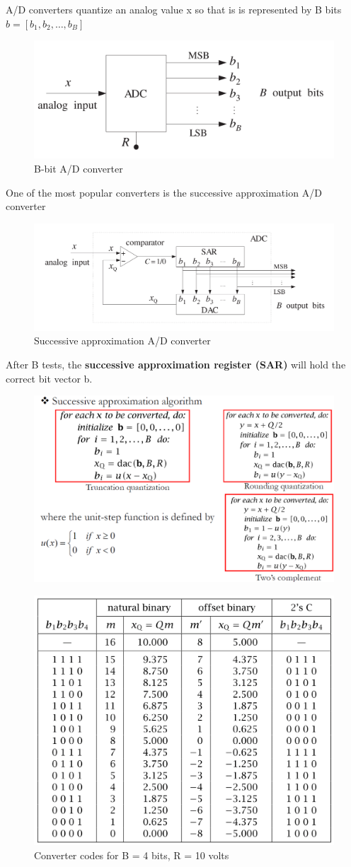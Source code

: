\documentclass[11pt, a4paper]{article}
\begin{document}
A/D converters quantize an analog value x so that is is represented by B bits  $b=[b_1, b_2,…,b_B]$
\begin{figure}[h!]
    \centering
    \includegraphics[width=0.5\linewidth]{img/21.png}
    \caption{B-bit A/D converter}
\end{figure}
\newpage
One of the most popular converters is the successive approximation A/D converter
\begin{figure}[h!]
    \centering
    \includegraphics[width=0.5\linewidth]{img/22.png}
    \caption{Successive approximation A/D converter}
\end{figure}

After B tests, the \textbf{successive approximation register (SAR)} will hold the correct bit vector b.

\begin{figure}[h!]
    \centering
    \includegraphics[width=0.5\linewidth]{img/23.png}
\end{figure}
\begin{figure}[h!]
    \centering
    \includegraphics[width=0.5\linewidth]{img/28.png}
    \caption{Converter codes for B = 4 bits, R = 10 volts}
\end{figure}
\end{document}
